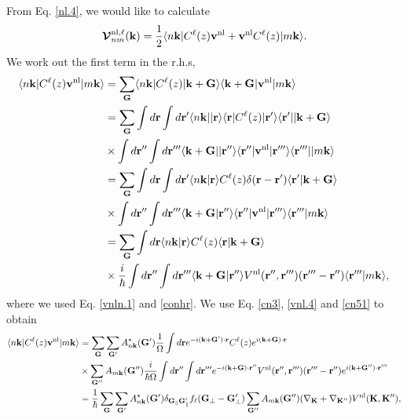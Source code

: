 \documentclass[letterpaper,aps]{revtex4}
\begin{document}
From Eq. \eqref{nl.4}, we would like to calculate
\begin{align}\label{vnl.5}
\boldsymbol{\mathcal{V}}^{\mathrm{nl},\ell}_{nm}(\mathbf{k})=\frac{1}{2}
\langle n\mathbf{k} | 
C^\ell(z)\mathbf{v}^\mathrm{nl}+\mathbf{v}^\mathrm{nl} C^\ell(z)  
| m\mathbf{k} \rangle
.
\end{align}  
We work out the first term in the r.h.s,
\begin{align}\label{vnl.6}
\langle n\mathbf{k} |C^\ell(z) 
\mathbf{v}^\mathrm{nl}| m\mathbf{k} \rangle
&=\sum_{\mathbf{G}}
\langle n\mathbf{k} |C^\ell(z)| \mathbf{k}+\mathbf{G} \rangle
\langle \mathbf{k}+\mathbf{G} |\mathbf{v}^\mathrm{nl}| m\mathbf{k} \rangle
\nonumber\\
&=\sum_{\mathbf{G}}
\int d\mathbf{r} 
\int d\mathbf{r}' 
\langle n\mathbf{k} |
| \mathbf{r} \rangle\langle \mathbf{r} |  
C^\ell(z) 
| \mathbf{r}' \rangle\langle \mathbf{r}' |
| \mathbf{k}+\mathbf{G} \rangle
\nonumber\\
&\times 
\int d\mathbf{r}'' 
\int d\mathbf{r}''' 
\langle \mathbf{k}+\mathbf{G} |
| \mathbf{r}'' \rangle\langle \mathbf{r}'' | 
\mathbf{v}^\mathrm{nl} 
| \mathbf{r}''' \rangle\langle \mathbf{r}''' | 
| m\mathbf{k} \rangle
\nonumber\\
&=\sum_{\mathbf{G}}
\int d\mathbf{r} 
\int d\mathbf{r}' 
\langle {n\mathbf{k}} | {\mathbf{r}} \rangle
C^\ell(z) 
\delta(\mathbf{r}-\mathbf{r}') 
\langle {\mathbf{r}'} | {\mathbf{k}+\mathbf{G}} \rangle
\nonumber\\
&\times 
\int d\mathbf{r}'' 
\int d\mathbf{r}''' 
\langle {\mathbf{k}+\mathbf{G}} | {\mathbf{r}''} \rangle
\langle \mathbf{r}'' | 
\mathbf{v}^\mathrm{nl} 
| \mathbf{r}''' \rangle
\langle {\mathbf{r}'''} | {m\mathbf{k}} \rangle
\nonumber\\
&=\sum_{\mathbf{G}}
\int d\mathbf{r} 
\langle {n\mathbf{k}} | {\mathbf{r}} \rangle
C^\ell(z) 
\langle {\mathbf{r}} | {\mathbf{k}+\mathbf{G}} \rangle
\nonumber\\
&\times 
\frac{i}{\hbar}
\int d\mathbf{r}'' 
\int d\mathbf{r}''' 
\langle {\mathbf{k}+\mathbf{G}} | {\mathbf{r}''} \rangle
V^\mathrm{nl}(\mathbf{r}'',\mathbf{r}''')(\mathbf{r}'''-\mathbf{r}'') 
\langle {\mathbf{r}'''} | {m\mathbf{k}} \rangle
,
\end{align}
where we used Eq. \eqref{vnln.1} and \eqref{conhr}. 
We use Eq. \eqref{cn3}, \eqref{vnl.4} and \eqref{cn51}  to obtain
\begin{align}\label{vnl.7}
\langle n\mathbf{k} |C^\ell(z) 
\mathbf{v}^\mathrm{nl}| m\mathbf{k} \rangle
&=\sum_{\mathbf{G}}
\sum_{\mathbf{G}'}
A^*_{n\mathbf{k}}(\mathbf{G}') 
\frac{1}{\Omega}
\int d\mathbf{r} 
e^{-i(\mathbf{k}+\mathbf{G}')\cdot\mathbf{r}}
C^\ell(z) 
e^{i(\mathbf{k}+\mathbf{G})\cdot\mathbf{r}}
\nonumber\\
&\times 
\sum_{\mathbf{G}''}
A_{m\mathbf{k}}(\mathbf{G}'') 
\frac{i}{\hbar\Omega}
\int d\mathbf{r}'' 
\int d\mathbf{r}''' 
e^{-i(\mathbf{k}+\mathbf{G})\cdot\mathbf{r}''} 
V^\mathrm{nl}(\mathbf{r}'',\mathbf{r}''')(\mathbf{r}'''-\mathbf{r}'') 
e^{i(\mathbf{k}+\mathbf{G}'')\cdot\mathbf{r}'''}
\nonumber\\
&=
\frac{1}{\hbar}
\sum_{\mathbf{G}}
\sum_{\mathbf{G}'}
A^*_{n\mathbf{k}}(\mathbf{G}') 
\delta_{\mathbf{G}_\parallel \mathbf{G}'_\parallel}f_\ell(\mathbf{G}_\perp-\mathbf{G}'_\perp) 
\sum_{\mathbf{G}''}
A_{m\mathbf{k}}(\mathbf{G}'') 
(\nabla_{\mathbf{K}}+\nabla_{\mathbf{K}''}) 
V^\mathrm{nl}(\mathbf{K},\mathbf{K}'') 
,
\end{align}
\end{document}
